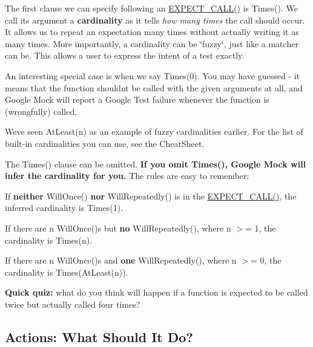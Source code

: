 The first clause we can specify following an {\ttfamily \hyperlink{gmock-spec-builders_8h_a535a6156de72c1a2e25a127e38ee5232}{E\+X\+P\+E\+C\+T\+\_\+\+C\+A\+L\+L()}} is {\ttfamily Times()}. We call its argument a {\bfseries cardinality} as it tells {\itshape how many times} the call should occur. It allows us to repeat an expectation many times without actually writing it as many times. More importantly, a cardinality can be \char`\"{}fuzzy\char`\"{}, just like a matcher can be. This allows a user to express the intent of a test exactly.

An interesting special case is when we say {\ttfamily Times(0)}. You may have guessed -\/ it means that the function shouldn\textquotesingle{}t be called with the given arguments at all, and Google Mock will report a Google Test failure whenever the function is (wrongfully) called.

We\textquotesingle{}ve seen {\ttfamily At\+Least(n)} as an example of fuzzy cardinalities earlier. For the list of built-\/in cardinalities you can use, see the Cheat\+Sheet.

The {\ttfamily Times()} clause can be omitted. {\bfseries If you omit {\ttfamily Times()}, Google Mock will infer the cardinality for you.} The rules are easy to remember\+:


\begin{DoxyItemize}
\item If {\bfseries neither} {\ttfamily Will\+Once()} {\bfseries nor} {\ttfamily Will\+Repeatedly()} is in the {\ttfamily \hyperlink{gmock-spec-builders_8h_a535a6156de72c1a2e25a127e38ee5232}{E\+X\+P\+E\+C\+T\+\_\+\+C\+A\+L\+L()}}, the inferred cardinality is {\ttfamily Times(1)}.
\item If there are {\ttfamily n Will\+Once()}\textquotesingle{}s but {\bfseries no} {\ttfamily Will\+Repeatedly()}, where {\ttfamily n} $>$= 1, the cardinality is {\ttfamily Times(n)}.
\item If there are {\ttfamily n Will\+Once()}\textquotesingle{}s and {\bfseries one} {\ttfamily Will\+Repeatedly()}, where {\ttfamily n} $>$= 0, the cardinality is {\ttfamily Times(\+At\+Least(n))}.
\end{DoxyItemize}

{\bfseries Quick quiz\+:} what do you think will happen if a function is expected to be called twice but actually called four times?

\subsection*{Actions\+: What Should It Do?}

